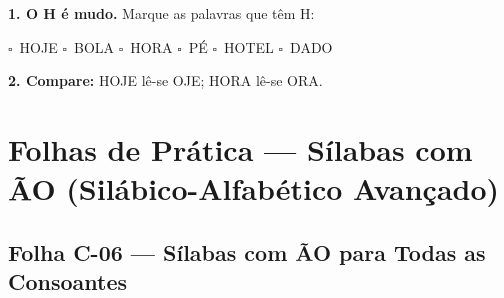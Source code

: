 \begin{somletra}[title={\faMusic~Atividade de Som da Letra --- B\^onus (n\~ao vale nota)}]
\textbf{1. O H \'e{} mudo.} Marque as palavras que t\^e{}m H:
\begin{center}
$\square$~HOJE \quad $\square$~BOLA \quad $\square$~HORA \quad $\square$~P\'E \quad $\square$~HOTEL \quad $\square$~DADO
\end{center}

\textbf{2. Compare:} HOJE l\^e-se OJE; HORA l\^e-se ORA.
\end{somletra}



\section{Folhas de Prática --- Sílabas com ÃO (Silábico-Alfabético Avançado)}


\subsection{Folha C-06 --- Sílabas com ÃO para Todas as Consoantes}

